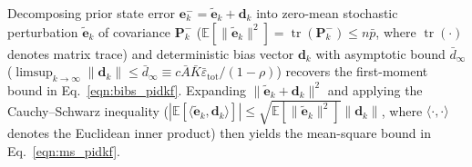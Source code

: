 \documentclass[10pt,a4paper]{article}
\begin{document}
Decomposing prior state error $\mathbf{e}_k^- = \tilde{\mathbf{e}}_k + \mathbf{d}_k$ into zero-mean stochastic perturbation $\tilde{\mathbf{e}}_k$ of covariance $\mathbf{P}_k^-$ ($\mathbb{E}[\|\tilde{\mathbf{e}}_k\|^2] = \operatorname{tr}(\mathbf{P}_k^-) \le n\bar{p}$, where $\operatorname{tr}(\cdot)$ denotes matrix trace) and deterministic bias vector $\mathbf{d}_k$ with asymptotic bound $\bar{d}_\infty$ ($\limsup_{k\to\infty}\|\mathbf{d}_k\| \le \bar{d}_\infty \equiv c\bar{A}\bar{K}\bar{\varepsilon}_{\text{tot}}/(1-\rho)$) recovers the first-moment bound in Eq.~\eqref{eqn:bibs_pidkf}. Expanding $\|\tilde{\mathbf{e}}_k + \mathbf{d}_k\|^2$ and applying the Cauchy--Schwarz inequality ($|\mathbb{E}[\langle \tilde{\mathbf{e}}_k, \mathbf{d}_k \rangle]| \le \sqrt{\mathbb{E}[\|\tilde{\mathbf{e}}_k\|^2]}\|\mathbf{d}_k\|$, where $\langle \cdot, \cdot \rangle$ denotes the Euclidean inner product) then yields the mean-square bound in Eq.~\eqref{eqn:ms_pidkf}.

{\small{}
\let\oldbibitem\bibitem
\def\bibitem{\vspace{-5.2pt}\oldbibitem}


}
\end{document}
